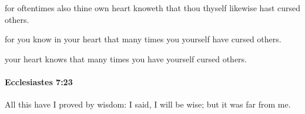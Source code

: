 			\begin{versebox}
					\item[BHS] 
					\item[LXX] 
					\item[ASV] for oftentimes also thine own heart knoweth that thou thyself likewise hast cursed others.
					\item[NIV] for you know in your heart that many times you yourself have cursed others.
					\item[NRSV] your heart knows that many times you have yourself cursed others.
			\end{versebox}

		\paragraph{Ecclesiastes 7:23} %
			\label{ECCLESIASTES-7-23}

			All this have I proved by wisdom: I said, I will be wise; but it was far from me.

